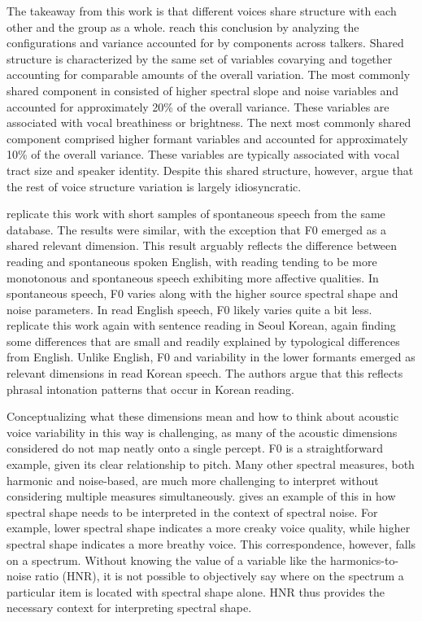 The takeaway from this work is that different voices share structure with each other and the group as a whole. \citet{lee_2019_acoustic} reach this conclusion by analyzing the configurations and variance accounted for by components across talkers. Shared structure is characterized by the same set of variables covarying and together accounting for comparable amounts of the overall variation. The most commonly shared component in \citet{lee_2019_acoustic} consisted of higher spectral slope and noise variables and accounted for approximately 20\% of the overall variance. These variables are associated with vocal breathiness or brightness. The next most commonly shared component comprised higher formant variables and accounted for approximately 10\% of the overall variance. These variables are typically associated with vocal tract size and speaker identity. Despite this shared structure, however, \citet{lee_2019_acoustic} argue that the rest of voice structure variation is largely idiosyncratic. 

\citet{lee_2019_spontaneous} replicate this work with short samples of spontaneous speech from the same database. The results were similar, with the exception that F0 emerged as a shared relevant dimension. This result arguably reflects the difference between reading and spontaneous spoken English, with reading tending to be more monotonous and spontaneous speech exhibiting more affective qualities. In spontaneous speech, F0 varies along with the higher source spectral shape and noise parameters. In read English speech, F0 likely varies quite a bit less. \citet{lee_2020_language} replicate this work again with sentence reading in Seoul Korean, again finding some differences that are small and readily explained by typological differences from English. Unlike English, F0 and variability in the lower formants emerged as relevant dimensions in read Korean speech. The authors argue that this reflects phrasal intonation patterns that occur in Korean reading. 

Conceptualizing what these dimensions mean and how to think about acoustic voice variability in this way is challenging, as many of the acoustic dimensions considered do not map neatly onto a single percept. F0 is a straightforward example, given its clear relationship to pitch. Many other spectral measures, both harmonic and noise-based, are much more challenging to interpret without considering multiple measures simultaneously. \citet{garellek_2019_voice} gives an example of this in how spectral shape needs to be interpreted in the context of spectral noise. For example, lower spectral shape indicates a more creaky voice quality, while higher spectral shape indicates a more breathy voice. This correspondence, however, falls on a spectrum. Without knowing the value of a variable like the harmonics-to-noise ratio (HNR), it is not possible to objectively say where on the spectrum a particular item is located with spectral shape alone. HNR thus provides the necessary context for interpreting spectral shape. 

